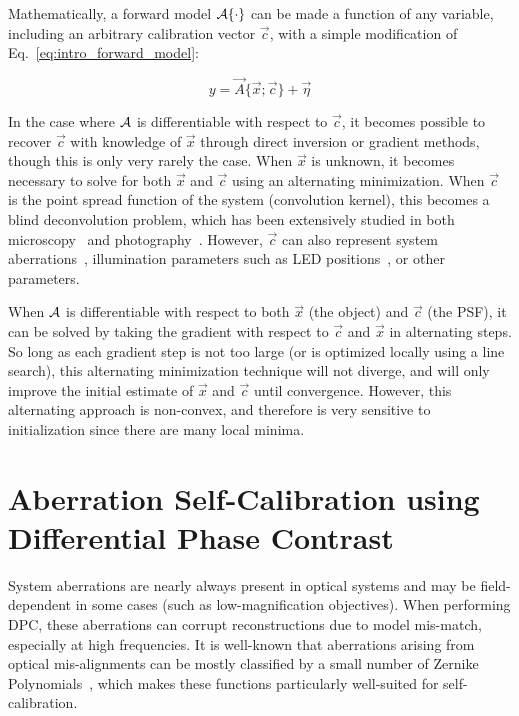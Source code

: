 Mathematically, a forward model $\mathcal{A}\{\cdot\}$ can be made a function of any variable, including an arbitrary calibration vector $\vec{c}$, with a simple modification of Eq.~\ref{eq:intro_forward_model}:

\begin{equation}\label{eq:self_calib_forward}
    y = \vec{A}\{\vec{x}; \vec{c}\} + \vec{\eta}
\end{equation}

In the case where $\mathcal{A}$ is differentiable with respect to $\vec{c}$, it becomes possible to recover $\vec{c}$ with knowledge of $\vec{x}$ through direct inversion or gradient methods, though this is only very rarely the case. When $\vec{x}$ is unknown, it becomes necessary to solve for both $\vec{x}$ and $\vec{c}$ using an alternating minimization. When $\vec{c}$ is the point spread function of the system (convolution kernel), this becomes a blind deconvolution problem, which has been extensively studied in both microscopy~\cite{Holmes1992blind, sarder2006deconvolution} and photography~\cite{ayers1988iterative, bell1995information, chan1998total, levin2006blind}. However, $\vec{c}$ can also represent system aberrations~\cite{Ou:14}, illumination parameters such as LED positions~\cite{Yeh2015}, or other parameters.

When $\mathcal{A}$ is differentiable with respect to both $\vec{x}$ (the object) and $\vec{c}$ (the PSF), it can be solved by taking the gradient with respect to $\vec{c}$ and $\vec{x}$ in alternating steps. So long as each gradient step is not too large (or is optimized locally using a line search), this alternating minimization technique will not diverge, and will only improve the initial estimate of $\vec{x}$ and $\vec{c}$ until convergence. However, this alternating approach is non-convex, and therefore is very sensitive to initialization since there are many local minima.

\section{Aberration Self-Calibration using Differential Phase Contrast}\label{sec:selfcal:dpc}

System aberrations are nearly always present in optical systems and may be field-dependent in some cases (such as low-magnification objectives). When performing DPC, these aberrations can corrupt reconstructions due to model mis-match, especially at high frequencies. It is well-known that aberrations arising from optical mis-alignments can be mostly classified by a small number of Zernike Polynomials~\cite{ZERNIKE1934689}, which makes these functions particularly well-suited for self-calibration.

